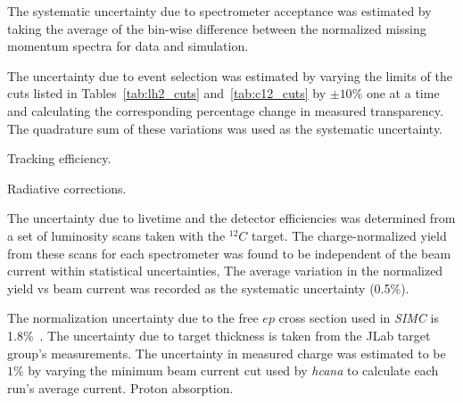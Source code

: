 The systematic uncertainty due to spectrometer acceptance was estimated by
taking the average of the bin-wise difference between the normalized missing
momentum spectra for data and simulation.


The uncertainty due to event selection was estimated by varying the limits of
the cuts listed in Tables~\ref{tab:lh2_cuts} and~\ref{tab:c12_cuts}
by $\pm10\%$ one at a time
and calculating the corresponding percentage change in measured transparency.
The quadrature sum of these variations was used as the systematic uncertainty.


Tracking efficiency.


Radiative corrections.


The uncertainty due to livetime and the detector efficiencies was determined
from a set of luminosity scans taken with the ${}^{12}C$ target.
The charge-normalized yield from these scans for each spectrometer was found to
be independent of the beam current within statistical uncertainties,
The average variation in the normalized yield vs beam current was recorded as the
systematic uncertainty (0.5\%).


The normalization uncertainty due to the free $ep$ cross section used in
\textit{SIMC} is 1.8\%~\cite{Bosted_1995}.
The uncertainty due to target thickness is taken from the JLab target group's
measurements. %
The uncertainty in measured charge was estimated to be $1\%$ by varying the
minimum beam current cut used by \textit{hcana} to calculate each run's average
current.
Proton absorption.



